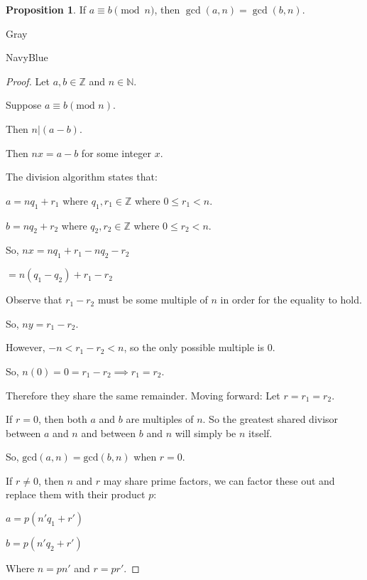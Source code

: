 \documentclass[12pt]{amsart}
\theoremstyle{named}
\newenvironment{prf}
{\medskip\begin{color}{Gray}\begin{framed}\begin{color}{NavyBlue}\begin{proof}[Proof]
\doublespacing}
{\end{proof}\end{color}\end{framed}\end{color}\medskip}
\theoremstyle{definition}
\newtheorem{proposition}{Proposition}
\begin{document}
\begin{proposition}
	If $a\equiv b\pmod n$, then $\gcd(a,n) = \gcd(b,n)$.
\end{proposition}

\begin{prf}
	\phantom{ }

	Let $a,b \in \mathbb Z$ and $n \in \mathbb N$. 

	Suppose $a \equiv b (\text{mod } n)$.

	Then $n|(a-b)$.

	Then $nx = a-b$ for some integer $x$.

	The division algorithm states that:

	\begin{adjustwidth}{2em}{0em}
		$a = nq_1 + r_1$ where $q_1, r_1 \in \mathbb Z$ where $0 \leq r_1 < n$.

		$b = nq_2 + r_2$ where $q_2, r_2 \in \mathbb Z$ where $0 \leq r_2 < n$.
	\end{adjustwidth}

	So, $nx = nq_1 + r_1 - nq_2 - r_2$

	\hspace{3.15em}$= n(q_1 - q_2) + r_1 - r_2$

	Observe that $r_1 - r_2$ must be some multiple of $n$ in order for the equality to hold.

	So, $ny = r_1-r_2$.

	However, $-n < r_1 - r_2 < n$, so the only possible multiple is $0$.

	So, $n(0) = 0 = r_1-r_2 \implies r_1 = r_2$.

	Therefore they share the same remainder. Moving forward: Let $r = r_1 = r_2$.

	If $r = 0$, then both $a$ and $b$ are multiples of $n$. So the greatest shared divisor
	between $a$ and $n$ and between $b$ and $n$ will simply be $n$ itself. 

	So, $\text{gcd}(a,n) = \text{gcd}(b,n)$ when $r = 0$. 

	If $r \neq 0$, then $n$ and $r$ may share prime factors, we can factor these out and 
	replace them with their product $p$:
	\begin{adjustwidth}{2em}{0em}
		$a = p(n'q_1+r')$

		$b = p(n'q_2+r')$
	\end{adjustwidth}

	Where $n = pn'$ and $r = pr'$.


\end{prf}
\end{document}
